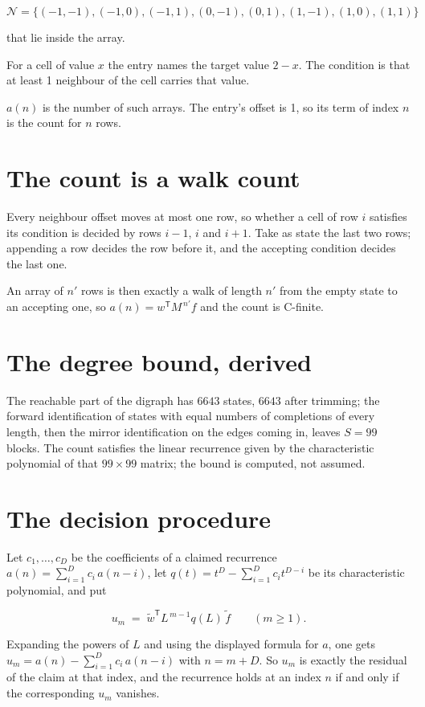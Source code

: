 \documentclass[11pt]{article}
\theoremstyle{definition}
\begin{document}
\[\mathcal{N} = \{(-1,-1), (-1,0), (-1,1), (0,-1), (0,1), (1,-1), (1,0), (1,1)\}\]

that lie inside the array.

For a cell of value $x$ the entry names the target value $2 - x$. The condition is that at least 1 neighbour of the cell carries that value.

$a(n)$ is the number of such arrays. The entry's offset is 1, so its term of index $n$ is the count for $n$ rows.

\section{The count is a walk count}

Every neighbour offset moves at most one row, so whether a cell of row $i$ satisfies its condition is decided by rows $i-1$, $i$ and $i+1$. Take as state the last two rows; appending a row decides the row before it, and the accepting condition decides the last one.

An array of $n'$ rows is then exactly a walk of length $n'$ from the empty state to an accepting one, so $a(n) = w^{\mathsf T}M^{\,n'}f$ and the count is C-finite.

\section{The degree bound, derived}

The reachable part of the digraph has $6643$ states, $6643$ after trimming; the forward identification of states with equal numbers of completions of every length, then the mirror identification on the edges coming in, leaves $S = 99$ blocks. The count satisfies the linear recurrence given by the characteristic polynomial of that $99\times99$ matrix; the bound is computed, not assumed.

\section{The decision procedure}

Let $c_1,\dots,c_D$ be the coefficients of a claimed recurrence $a(n) = \sum_{i=1}^{D} c_i\,a(n-i)$, let $q(t) = t^{D} - \sum_{i=1}^{D} c_i t^{D-i}$ be its characteristic polynomial, and put

\[u_m \;=\; \tilde w^{\mathsf T} L^{\,m-1} q(L)\,\tilde f \qquad (m \ge 1).\]

Expanding the powers of $L$ and using the displayed formula for $a$, one gets $u_m = a(n) - \sum_{i=1}^{D} c_i\,a(n-i)$ with $n = m + D$. So $u_m$ is exactly the residual of the claim at that index, and the recurrence holds at an index $n$ if and only if the corresponding $u_m$ vanishes.
\end{document}
